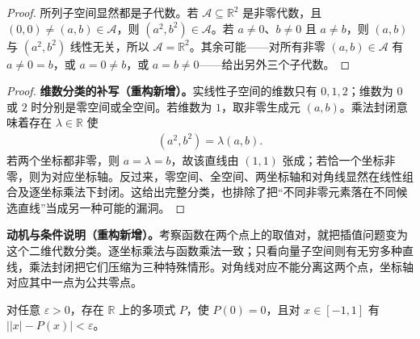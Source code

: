 \documentclass[../../main.tex]{subfiles}%
\begin{document}
\begin{proof}
所列子空间显然都是子代数。若 $\mathcal A\subseteq\mathbb R^2$ 是非零代数，且 $(0,0)\ne(a,b)\in\mathcal A$，则 $(a^2,b^2)\in\mathcal A$。若 $a\ne0$、$b\ne0$ 且 $a\ne b$，则 $(a,b)$ 与 $(a^2,b^2)$ 线性无关，所以 $\mathcal A=\mathbb R^2$。其余可能——对所有非零 $(a,b)\in\mathcal A$ 有 $a\ne0=b$，或 $a=0\ne b$，或 $a=b\ne0$——给出另外三个子代数。
\end{proof}
\begin{proof}
\textbf{维数分类的补写（重构新增）。}实线性子空间的维数只有 $0,1,2$；维数为 $0$ 或 $2$ 时分别是零空间或全空间。若维数为 $1$，取非零生成元 $(a,b)$。乘法封闭意味着存在 $\lambda\in\mathbb R$ 使
\begin{align*}
(a^2,b^2)=\lambda(a,b).
\end{align*}
若两个坐标都非零，则 $a=\lambda=b$，故该直线由 $(1,1)$ 张成；若恰一个坐标非零，则为对应坐标轴。反过来，零空间、全空间、两坐标轴和对角线显然在线性组合及逐坐标乘法下封闭。这给出完整分类，也排除了把“不同非零元素落在不同候选直线”当成另一种可能的漏洞。
\end{proof}
\begin{remark}
\textbf{动机与条件说明（重构新增）。}考察函数在两个点上的取值对，就把插值问题变为这个二维代数分类。逐坐标乘法与函数乘法一致；只看向量子空间则有无穷多种直线，乘法封闭把它们压缩为三种特殊情形。对角线对应不能分离这两个点，坐标轴对应其中一点为公共零点。
\end{remark}
\begin{lemma}\label{lemma:ch04-absolute-polynomial}
对任意 $\varepsilon>0$，存在 $\mathbb R$ 上的多项式 $P$，使 $P(0)=0$，且对 $x\in[-1,1]$ 有 $\bigl||x|-P(x)\bigr|<\varepsilon$。
\end{lemma}
\end{document}
